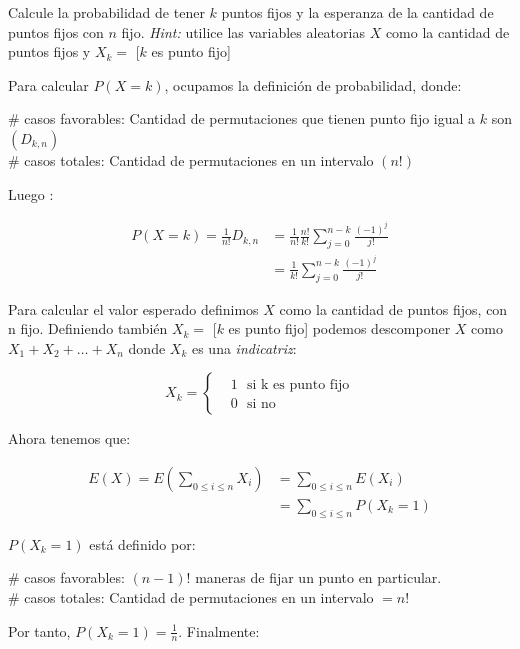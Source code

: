 \documentclass[letterpaper,10pt,table, dvipsnames]{article}
\begin{document}
\newpage

\begin{tcolorbox}
 Calcule la probabilidad de tener $k$ puntos fijos y la esperanza de la cantidad de puntos fijos con $n$ fijo. \textit{Hint:} utilice las variables aleatorias $X$ como la cantidad de puntos fijos y $X_k=$ [$k$ es punto fijo]
\end{tcolorbox}

Para calcular $P(X=k)$, ocupamos la definición de probabilidad, donde:

\# casos favorables: Cantidad de permutaciones que tienen punto fijo igual a $k$ son $(D_{k,n})$\\
\# casos totales: Cantidad de permutaciones en un intervalo $(n!)$

Luego :

\begin{align*}
       P(X=k) = \frac{1}{n!} D_{k,n} &= \frac{1}{n!} \frac{n!}{k!} \sum_{j=0}^{n-k} \frac{(-1)^j}{j!} \\
       &= \frac{1}{k!} \sum_{j=0}^{n-k} \frac{(-1)^j}{j!}
\end{align*}

Para calcular el valor esperado definimos $X$ como la cantidad de puntos fijos, con n fijo. Definiendo también $X_k=$ [$k$ es punto fijo] podemos descomponer $X$ como $X_1 + X_2 + \ldots + X_n $ donde $X_k $ es una \textit{indicatriz}:

\begin{equation*}
X_k= \left\{
\begin{aligned}
    &1\ \ \ \textrm{si k es punto fijo}\\
    &0 \ \ \ \textrm{si no}
\end{aligned}
\right.    
\end{equation*}

Ahora tenemos que:

\begin{align*}
    E(X) = E\left(\sum_{0\leq i \leq n} X_i \right) &= \sum_{0 \leq i \leq n}^{} E(X_i)\\ 
    &= \sum_{0 \leq i \leq n}^{} P(X_k = 1)
\end{align*}

$P(X_k =1)$ está definido por:

\# casos favorables: $(n-1)!$ maneras de fijar un punto en particular. \\
\# casos totales: Cantidad de permutaciones en un intervalo $= n!$

Por tanto, $P(X_k =1) = \frac{1}{n}$. Finalmente:
\end{document}
